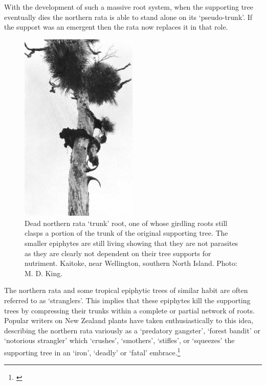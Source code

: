 With the development of such a massive root system, when the supporting tree eventually dies the northern rata is able to stand alone on its `pseudo-trunk'.
If the support was an emergent then the rata now replaces it in that role.

\begin{figure}
	\includegraphics[width=0.5\textwidth]{graphics/figure53dead-rata.jpg}
	\centering
	\caption[Dead northern rata `trunk' root]{Dead northern rata `trunk' root, one of whose girdling roots still clasps a portion of the trunk of the original supporting tree.
	The smaller epiphytes are still living showing that they are not parasites as they are clearly not dependent on their tree supports for nutriment.
	Kaitoke, near Wellington, southern North Island.
	Photo: M. D. King.}%
	\label{fig:53dead-rata}
\end{figure}

The northern rata and some tropical epiphytic trees of similar habit are often referred to as `stranglers'.
This implies that these epiphytes kill the supporting trees by compressing their trunks within a complete or partial network of roots.
Popular writers on New Zealand plants have taken enthusiastically to this idea, describing the northern rata variously as a `predatory gangster', `forest bandit' or `notorious strangler' which `crushes', `smothers', `stifles', or `squeezes' the supporting tree in an `iron', `deadly' or `fatal' embrace.\footnote{\cite{druce1971uncle}}

